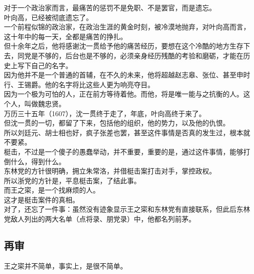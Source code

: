 \begin{multicols}{\theparacolNo}
对于一个政治家而言，最痛苦的惩罚不是免职、不是罢官，而是遗忘。\\

叶向高，已经被彻底遗忘了。\\

一个前程似锦的政治家，在政治生涯的黄金时刻，被冷漠地抛弃，对叶向高而言，这十年中的每一天，全都是痛苦的挣扎。\\

但十余年之后，他将感谢沈一贯给予他的痛苦经历，要想在这个冷酷的地方生存下去，同党是不够的，后台也是不够的，必须亲身经历残酷的考验和磨砺，才能在历史上写下自己的名字。\\

因为他并不是一个普通的首辅，在不久的未来，他将超越赵志皋、张位、甚至申时行、王锡爵。他的名字将比这些人更为响亮夺目。\\

因为一个极为可怕的人，正在前方等待着他。而他，将是唯一能与之抗衡的人。这个人，叫做魏忠贤。\\

万历三十五年（1607），沈一贯终于走了，年底，叶向高终于来了。\\

但沈一贯的一切，都留了下来，包括他的组织，他的势力，以及他的仇恨。\\

所以刘廷元、胡士相也好，疯子张差也罢，甚至这件事情是否真的发生过，根本就不要紧。\\

梃击，不过是一个傻子的愚蠢举动，并不重要，重要的是，通过这件事情，能够打倒什么，得到什么。\\

东林党的方针很明确，拥立朱常洛，并借梃击案打击对手，掌控政权。\\

所以浙党的方针是，平息梃击案，了结此事。\\

而王之寀，是一个找麻烦的人。\\

这才是梃击案件的真相。\\

对了，还忘了一件事：虽然没有迹象显示王之寀和东林党有直接联系，但此后东林党敌人列出的两大名单（点将录、朋党录）中，他都名列前茅。\\

\subsection{再审}
王之寀并不简单，事实上，是很不简单。\\


\end{multicols}
